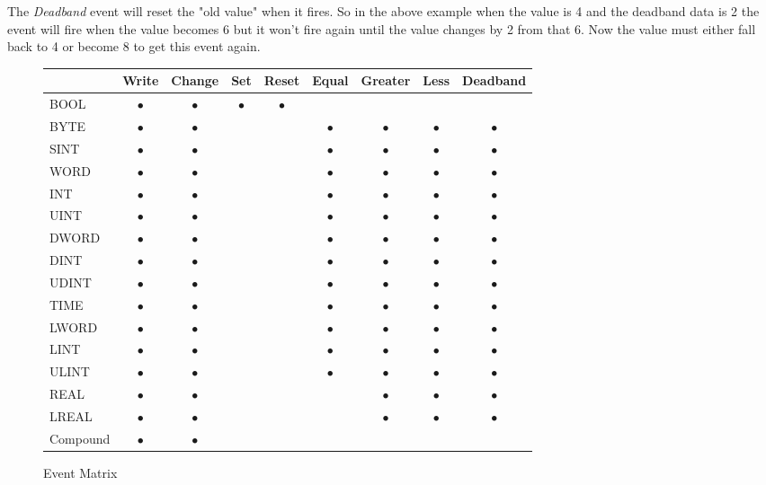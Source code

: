The \textit{Deadband} event will reset the "old value" when it fires.  So in the above example when the value is 4 and the deadband data is 2 the event will fire when the value becomes 6 but it won't fire again until the value changes by 2 from that 6.  Now the value must either fall back to 4 or become 8 to get this event again.

\begin{figure}[h]
\centering
\begin{tabular}{|l|c|c|c|c|c|c|c|c|}
\hline   & Write & Change & Set & Reset & Equal & Greater & Less & Deadband \\ 
\hline  BOOL & $\bullet$ & $\bullet$ & $\bullet$ & $\bullet$ &  &  &  &  \\ 
\hline  BYTE & $\bullet$ & $\bullet$ &  &  & $\bullet$ & $\bullet$ & $\bullet$ & $\bullet$ \\ 
\hline  SINT & $\bullet$ & $\bullet$ &  &  & $\bullet$ & $\bullet$ & $\bullet$ &$\bullet$  \\ 
\hline  WORD & $\bullet$ & $\bullet$ &  &  & $\bullet$ & $\bullet$ & $\bullet$ & $\bullet$ \\ 
\hline  INT & $\bullet$ & $\bullet$ &  &  & $\bullet$ & $\bullet$ & $\bullet$ & $\bullet$ \\ 
\hline  UINT & $\bullet$ & $\bullet$ &  &  & $\bullet$ & $\bullet$ & $\bullet$ & $\bullet$ \\ 
\hline  DWORD & $\bullet$ & $\bullet$ &  &  & $\bullet$ & $\bullet$ & $\bullet$ & $\bullet$ \\ 
\hline  DINT & $\bullet$ & $\bullet$ &  &  & $\bullet$ & $\bullet$ & $\bullet$ & $\bullet$ \\ 
\hline  UDINT & $\bullet$ & $\bullet$ &  &  & $\bullet$ & $\bullet$ & $\bullet$ & $\bullet$ \\ 
\hline  TIME & $\bullet$ & $\bullet$ &  &  & $\bullet$ & $\bullet$ & $\bullet$ & $\bullet$ \\ 
\hline  LWORD & $\bullet$ & $\bullet$ &  &  & $\bullet$ & $\bullet$ & $\bullet$ & $\bullet$ \\ 
\hline  LINT & $\bullet$ & $\bullet$ &  &  & $\bullet$ & $\bullet$ & $\bullet$ & $\bullet$ \\ 
\hline  ULINT & $\bullet$ & $\bullet$ &  &  & $\bullet$ & $\bullet$ & $\bullet$ & $\bullet$ \\ 
\hline  REAL & $\bullet$ & $\bullet$ &  &  &  & $\bullet$ & $\bullet$ & $\bullet$ \\ 
\hline  LREAL & $\bullet$ & $\bullet$ &  &  &  & $\bullet$ & $\bullet$ & $\bullet$ \\ 
\hline  Compound & $\bullet$ & $\bullet$ &  &  &  &  &  &  \\ 
\hline 
\end{tabular} 
\caption{\label{Event Matrix}Event Matrix}
\end{figure}

